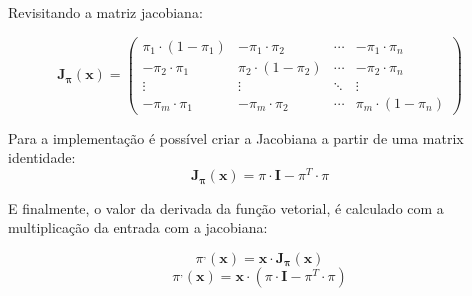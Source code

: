 \documentclass{article}
\begin{document}
Revisitando a matriz jacobiana:

\begin{equation*}
\mathbf{J_{\pi}}(\mathbf{x}) = 
\begin{pmatrix}
\pi_1 \cdot (1 - \pi_1) & - \pi_1 \cdot \pi_2 & \cdots & - \pi_1 \cdot \pi_n \\
- \pi_2 \cdot \pi_1 & \pi_2 \cdot (1 - \pi_2) & \cdots & - \pi_2 \cdot \pi_n \\
\vdots  & \vdots  & \ddots & \vdots  \\
- \pi_m \cdot \pi_1 & - \pi_m \cdot \pi_2 & \cdots & \pi_m \cdot (1 - \pi_n)
\end{pmatrix}
\end{equation*}

Para a implementação é possível criar a Jacobiana a partir de uma matrix identidade:
\[ \mathbf{J_{\pi}}(\mathbf{x}) = \pi \cdot \mathbf{I} - \pi^{T} \cdot \pi \]

E finalmente, o valor da derivada da função vetorial, é calculado com a multiplicação da entrada com a jacobiana:

\[ \pi^{,}(\mathbf{x}) = \mathbf{x} \cdot \mathbf{J_{\pi}}(\mathbf{x}) \]
\[ \pi^{,}(\mathbf{x}) = \mathbf{x} \cdot (\pi \cdot \mathbf{I} - \pi^{T} \cdot \pi) \]
\end{document}
